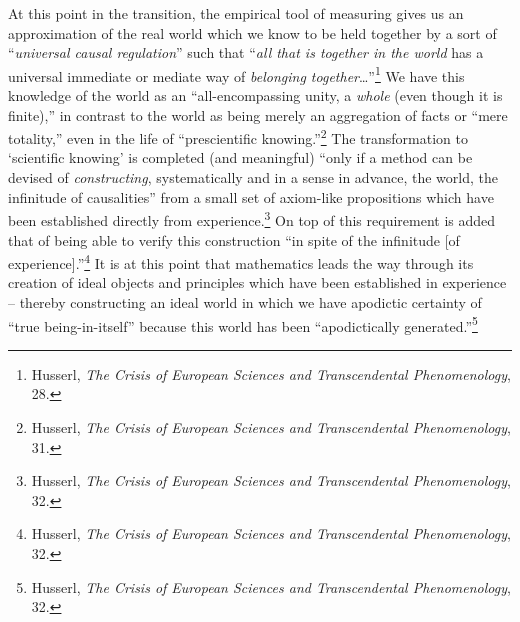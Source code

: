 \documentclass[12pt]{article}
\begin{document}
	At this point in the transition, the empirical tool of measuring gives us an approximation of the real world which we know to be held together by a sort of ``\emph{universal causal regulation}'' such that ``\emph{all that is together in the world} has a universal immediate or mediate way of \emph{belonging together}\ldots''\footnote{Husserl, \emph{The Crisis of European Sciences and Transcendental Phenomenology}, 28.} We have this knowledge of the world as an ``all-encompassing unity, a \emph{whole} (even though it is finite),'' in contrast to the world as being merely an aggregation of facts or ``mere totality,'' even in the life of ``prescientific knowing.''\footnote{Husserl, \emph{The Crisis of European Sciences and Transcendental Phenomenology}, 31.} The transformation to `scientific knowing' is completed (and meaningful) ``only if a method can be devised of \emph{constructing}, systematically and in a sense in advance, the world, the infinitude of causalities'' from a small set of axiom-like propositions which have been established directly from experience.\footnote{Husserl, \emph{The Crisis of European Sciences and Transcendental Phenomenology}, 32.} On top of this requirement is added that of being able to verify this construction ``in spite of the infinitude [of experience].''\footnote{Husserl, \emph{The Crisis of European Sciences and Transcendental Phenomenology}, 32.} It is at this point that mathematics leads the way through its creation of ideal objects and principles which have been established in experience -- thereby constructing an ideal world in which we have apodictic certainty of ``true being-in-itself'' because this world has been ``apodictically generated.''\footnote{Husserl, \emph{The Crisis of European Sciences and Transcendental Phenomenology}, 32.} 
\end{document}

